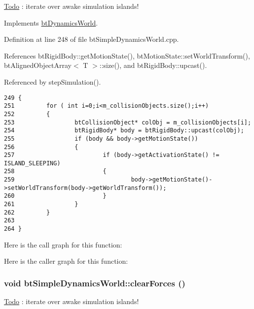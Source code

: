 \begin{Desc}
\item[\hyperlink{todo__todo000034}{Todo}]: iterate over awake simulation islands! \end{Desc}


Implements \hyperlink{classbt_dynamics_world}{btDynamicsWorld}.

Definition at line 248 of file btSimpleDynamicsWorld.cpp.

References btRigidBody::getMotionState(), btMotionState::setWorldTransform(), btAlignedObjectArray$<$ T $>$::size(), and btRigidBody::upcast().

Referenced by stepSimulation().

\begin{Code}\begin{verbatim}249 {
251         for ( int i=0;i<m_collisionObjects.size();i++)
252         {
253                 btCollisionObject* colObj = m_collisionObjects[i];
254                 btRigidBody* body = btRigidBody::upcast(colObj);
255                 if (body && body->getMotionState())
256                 {
257                         if (body->getActivationState() != ISLAND_SLEEPING)
258                         {
259                                 body->getMotionState()->setWorldTransform(body->getWorldTransform());
260                         }
261                 }
262         }
263 
264 }
\end{verbatim}
\end{Code}




Here is the call graph for this function:

Here is the caller graph for this function:\hypertarget{classbt_simple_dynamics_world_c44c80444f4d6d4e3c2955dd43b7a93a}{
\subsubsection[clearForces]{\setlength{\rightskip}{0pt plus 5cm}void btSimpleDynamicsWorld::clearForces ()}}
\label{classbt_simple_dynamics_world_c44c80444f4d6d4e3c2955dd43b7a93a}




\begin{Desc}
\item[\hyperlink{todo__todo000033}{Todo}]: iterate over awake simulation islands! \end{Desc}


